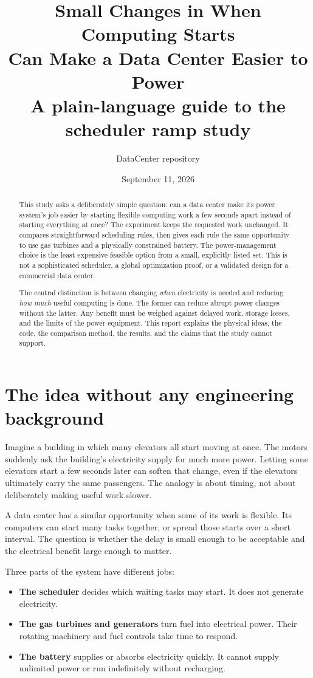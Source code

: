 \documentclass[11pt]{article}
\title{Small Changes in When Computing Starts\\
Can Make a Data Center Easier to Power\\[0.4em]
\large A plain-language guide to the scheduler ramp study}
\author{DataCenter repository}
\date{September 11, 2026}
\begin{document}
\maketitle

\begin{abstract}
This study asks a deliberately simple question: can a data center make its
power system's job easier by starting flexible computing work a few seconds
apart instead of starting everything at once? The experiment keeps the
requested work unchanged. It compares straightforward scheduling rules,
then gives each rule the same opportunity to use gas turbines and a
physically constrained battery. The power-management choice is the
least expensive feasible option from a small, explicitly listed set.
This is not a sophisticated scheduler, a global optimization proof, or a
validated design for a commercial data center.

The central distinction is between changing \emph{when} electricity is
needed and reducing \emph{how much} useful computing is done. The former can
reduce abrupt power changes without the latter. Any benefit must be
weighed against delayed work, storage losses, and the limits of the
power equipment. This report explains the physical ideas, the code,
the comparison method, the results, and the claims that the study
cannot support.
\end{abstract}

\tableofcontents
\clearpage

\section{The idea without any engineering background}

Imagine a building in which many elevators all start moving at once.
The motors suddenly ask the building's electricity supply for much more
power. Letting some elevators start a few seconds later can soften that
change, even if the elevators ultimately carry the same passengers.
The analogy is about timing, not about deliberately making useful work slower.

A data center has a similar opportunity when some of its work is flexible.
Its computers can start many tasks together, or spread those starts over
a short interval. The question is whether the delay is small enough to
be acceptable and the electrical benefit large enough to matter.

Three parts of the system have different jobs:
\begin{itemize}
\item \textbf{The scheduler} decides which waiting tasks may start.
It does not generate electricity.
\item \textbf{The gas turbines and generators} turn fuel into electrical
power. Their rotating machinery and fuel controls take time to respond.
\item \textbf{The battery} supplies or absorbs electricity quickly.
It cannot supply unlimited power or run indefinitely without recharging.
\end{itemize}
\end{document}
